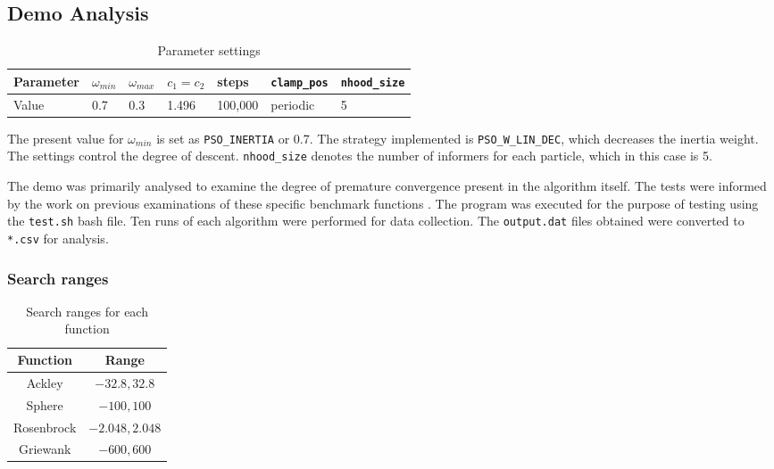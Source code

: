 \documentclass[KomodoMain.tex]{subfiles}
\begin{document}
\subsection{Demo Analysis}



\begin{table}[h]
\caption{Parameter settings}
\label{table:X}
\begin{tabular}{ p{1.75cm} p{1.4cm} p{1.4cm} p{1.75cm} p{1.5cm} p{2cm} p{2cm} }
 \hline
 Parameter   & $\omega_{min}$  & $\omega_{max}$ & $c_{1} = c_{2}$ & steps & \texttt{clamp\_pos} & \texttt{nhood\_size} \\
 \hline
 Value   & 0.7  & 0.3 &  1.496 & 100,000 & periodic & 5 \\
 \hline
\end{tabular}
\end{table}

The present value for $\omega_{min}$ is set as \texttt{PSO\_INERTIA} or 0.7. The strategy implemented is \texttt{PSO\_W\_LIN\_DEC}, which decreases the inertia weight. The settings control the degree of descent. \texttt{nhood\_size} denotes the number of informers for each particle, which in this case is 5.
\par
The demo was primarily analysed to examine the degree of premature convergence present in the algorithm itself. The tests were informed by the work on previous examinations of these specific benchmark functions \cite{funcs}. The program was executed for the purpose of testing using the \texttt{test.sh} bash file. Ten runs of each algorithm were performed for data collection. The \texttt{output.dat} files obtained were converted to \texttt{*.csv} for analysis.

\subsubsection{Search ranges}

\begin{table}[h]
\centering
\caption{Search ranges for each function}
\label{table:X}
\begin{tabular}{ |c c| }
 \hline
 Function   & Range \\
 \hline
 Ackley   & $-32.8, 32.8$  \\
 \hline
 Sphere & $-100, 100$ \\
 \hline
 Rosenbrock & $-2.048, 2.048$ \\
 \hline
 Griewank & $-600, 600$ \\
 \hline
\end{tabular}
\end{table}
\end{document}

